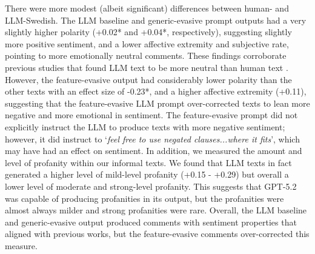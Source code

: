 \documentclass[thesis]{cluu}
\begin{document}
There were more modest (albeit significant) differences between human- and LLM-Swedish. The LLM baseline and generic-evasive prompt outputs had a very slightly higher polarity (+0.02* and +0.04*, respectively), suggesting slightly more positive sentiment, and a lower affective extremity and subjective rate, pointing to more emotionally neutral comments. These findings corroborate previous studies that found LLM text to be more neutral than human text \cite{guo2023closechatgpthumanexperts}. However, the feature-evasive output had considerably lower polarity than the other texts with an effect size of -0.23*, and a higher affective extremity (+0.11), suggesting that the feature-evasive LLM prompt over-corrected texts to lean more negative and more emotional in sentiment. The feature-evasive prompt did not explicitly instruct the LLM to produce texts with more negative sentiment; however, it did instruct to `\textit{feel free to use negated clauses...where it fits}', which may have had an effect on sentiment. In addition, we measured the amount and level of profanity within our informal texts. We found that LLM texts in fact generated a higher level of mild-level profanity (+0.15 - +0.29) but overall a lower level of moderate and strong-level profanity. This suggests that GPT-5.2 was capable of producing profanities in its output, but the profanities were almost always milder and strong profanities were rare. Overall, the LLM baseline and generic-evasive output produced comments with sentiment properties that aligned with previous works, but the feature-evasive comments over-corrected this measure.
\end{document}
